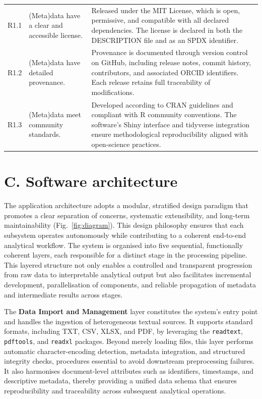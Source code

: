 \documentclass[8pt,a4paper]{article}
\begin{document}
\begin{longtable}{p{1.5cm} p{6cm} p{8.5cm}}
R1.1 & (Meta)data have a clear and accessible license. & Released under the MIT License, which is open, permissive, and compatible with all declared dependencies. The license is declared in both the \textsf{DESCRIPTION} file and as an SPDX identifier. \\
R1.2 & (Meta)data have detailed provenance. & Provenance is documented through version control on GitHub, including release notes, commit history, contributors, and associated ORCID identifiers. Each release retains full traceability of modifications. \\
R1.3 & (Meta)data meet community standards. & Developed according to CRAN guidelines and compliant with \textsf{R} community conventions. The software's Shiny interface and \textsf{tidyverse} integration ensure methodological reproducibility aligned with open-science practices. \\
\end{longtable}

\section*{C. \quad Software architecture}

The application architecture adopts a modular, stratified design paradigm that promotes a clear separation of concerns, systematic extensibility, and long-term maintainability (Fig.~\ref{fig:diagram}). This design philosophy ensures that each subsystem operates autonomously while contributing to a coherent end-to-end analytical workflow. The system is organised into five sequential, functionally coherent layers, each responsible for a distinct stage in the processing pipeline. This layered structure not only enables a controlled and transparent progression from raw data to interpretable analytical output but also facilitates incremental development, parallelisation of components, and reliable propagation of metadata and intermediate results across stages.

The \textbf{Data Import and Management} layer constitutes the system’s entry point and handles the ingestion of heterogeneous textual sources. It supports standard formats, including TXT, CSV, XLSX, and PDF, by leveraging the \texttt{readtext}, \texttt{pdftools}, and \texttt{readxl} packages. Beyond merely loading files, this layer performs automatic character-encoding detection, metadata integration, and structured integrity checks, procedures essential to avoid downstream preprocessing failures. It also harmonises document-level attributes such as identifiers, timestamps, and descriptive metadata, thereby providing a unified data schema that ensures reproducibility and traceability across subsequent analytical operations.
\end{document}
